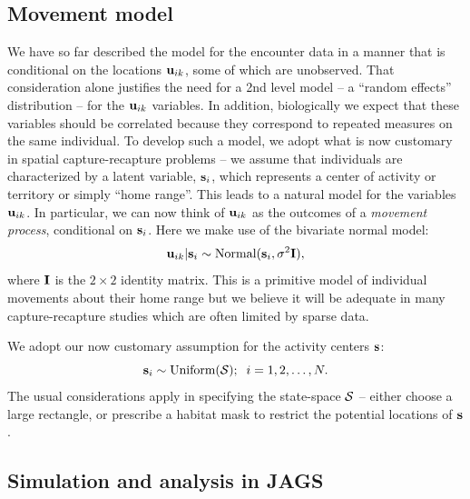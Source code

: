 \subsection{Movement model}

We have so far described the model for the encounter data in a manner
that is conditional on the locations ${\bf u}_{ik}$, some of which are
unobserved. That consideration alone justifies the need for a 2nd
level model -- a ``random effects'' distribution -- for the ${\bf
  u}_{ik}$ variables. In addition, biologically we expect that these
variables should be correlated because they correspond to repeated
measures on the same individual.  To develop such a model, we adopt
what is now customary in spatial capture-recapture problems -- we
assume that individuals are characterized by a latent variable, ${\bf
  s}_{i}$, which represents a center of activity or territory or
simply ``home range''. This leads to a natural model for the variables
${\bf u}_{ik}$. In particular, we can now think of ${\bf u}_{ik}$ as
the outcomes of a {\it movement process}, conditional on ${\bf
  s}_{i}$. Here we make use of the bivariate normal model:
\[
 {\bf u}_{ik} | {\bf s}_{i} \sim \mbox{Normal}({\bf s}_{i}, \sigma^{2}{\bf I}),
\]
where ${\bf I}$ is the $2\times 2$ identity matrix.  This is a
primitive model of individual movements about their home range but we
believe it will be adequate in many capture-recapture studies which
are often limited by sparse data.

We adopt our now customary assumption for the activity centers ${\bf s}$:
\[
 {\bf s}_{i} \sim \mbox{Uniform}({\cal S}); \; \; i=1,2,\ldots,N.
\]
The usual considerations apply in specifying the state-space ${\cal
  S}$ -- either choose a large rectangle, or prescribe a habitat mask
to restrict the potential locations of ${\bf s}$.



\subsection{Simulation and analysis in {\bf JAGS}}

